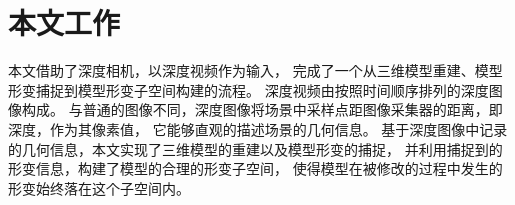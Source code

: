 
\section{本文工作}
本文借助了深度相机，以深度视频作为输入，
完成了一个从三维模型重建、模型形变捕捉到模型形变子空间构建的流程。
深度视频由按照时间顺序排列的深度图像构成。
与普通的图像不同，深度图像将场景中采样点距图像采集器的距离，即深度，作为其像素值，
它能够直观的描述场景的几何信息。
基于深度图像中记录的几何信息，本文实现了三维模型的重建以及模型形变的捕捉，
并利用捕捉到的形变信息，构建了模型的合理的形变子空间，
使得模型在被修改的过程中发生的形变始终落在这个子空间内。


